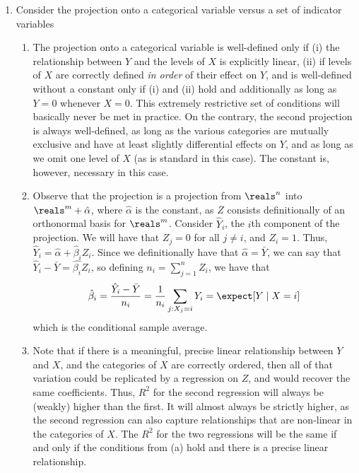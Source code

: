 \documentclass[10pt]{article}
\begin{document}
\begin{enumerate}
	\item Consider the projection onto a categorical variable versus a set of indicator variables \begin{enumerate} \item The projection onto a categorical variable is well-defined only if (i) the relationship between $Y$ and the levels of $X$ is explicitly linear, (ii) if levels of $X$ are correctly defined \emph{in order} of their effect on $Y$, and is well-defined without a constant only if (i) and (ii) hold and additionally as long as $Y = 0$ whenever $X = 0$. This extremely restrictive set of conditions will basically never be met in practice. On the contrary, the second projection is always well-defined, as long as the various categories are mutually exclusive and have at least slightly differential effects on $Y$, and as long as we omit one level of $X$ (as is standard in this case). The constant is, however, necessary in this case. \item Observe that the projection is a projection from $\reals^n$ into $\reals^m + \hat{\alpha}$, where $\hat{\alpha}$ is the constant, as $Z$ consists definitionally of an orthonormal basis for $\reals^m$. Consider $\hat{Y}_i$, the $i$th component of the projection. We will have that $Z_j = 0$ for all $j \ne i$, and $Z_i = 1$. Thus, $\hat{Y}_i = \hat{\alpha} + \hat{\beta}_i Z_i$. Since we definitionally have that $\hat{\alpha} = \bar{Y}$, we can say that $\hat{Y}_i - \bar{Y} = \hat{\beta_i} Z_i$, so defining $n_i = \sum_{j=1}^n Z_i$, we have that \[\hat{\beta}_i = \frac{\hat{Y}_i - \bar{Y}}{n_i} = \frac{1}{n_i} \sum_{j : X_j = i} Y_i = \expect[Y \mid X = i]\]which is the conditional sample average.\item Note that if there is a meaningful, precise linear relationship between $Y$ and $X$, and the categories of $X$ are correctly ordered, then all of that variation could be replicated by a regression on $Z$, and would recover the same coefficients. Thus, $R^2$ for the second regression will always be (weakly) higher than the first. It will almost always be strictly higher, as the second regression can also capture relationships that are non-linear in the categories of $X$. The $R^2$ for the two regressions will be the same if and only if the conditions from (a) hold and there is a precise linear relationship. \end{enumerate}

\end{enumerate}
\end{document}
